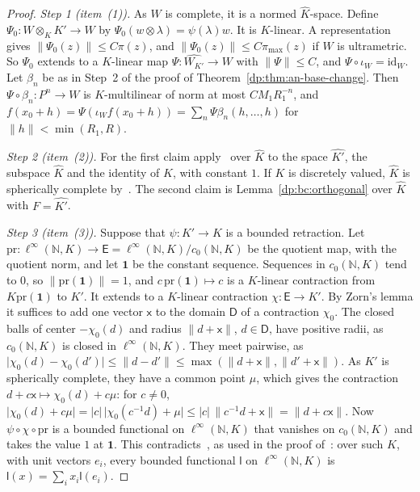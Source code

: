 \documentclass[11pt]{amsart}
\theoremstyle{definition}
\theoremstyle{remark}
\numberwithin{equation}{section}
\newcommand{\N}{\mathbb N}
\newcommand{\linf}{\ell^\infty}
\newcommand{\id}{\mathrm{id}}
\newcommand{\abs}[1]{\lvert #1\rvert}
\newcommand{\norm}[1]{\lVert #1\rVert}
\newcommand{\Kh}{\widehat K}
\theoremstyle{plain}
\theoremstyle{definition}
\theoremstyle{plain}
\begin{document}
\begin{proof}
\emph{Step 1 (item~(1)).} As $W$ is complete, it is a normed $\Kh$-space. Define $\Psi_0\colon W\otimes_KK'\to W$ by $\Psi_0(w\otimes\lambda)=\psi(\lambda)w$. It is $K$-linear. A representation gives $\norm{\Psi_0(z)}\le C\pi(z)$, and $\norm{\Psi_0(z)}\le C\pi_{\max}(z)$ if $W$ is ultrametric. So $\Psi_0$ extends to a $K$-linear map $\Psi\colon\widehat{W_{K'}}\to W$ with $\norm\Psi\le C$, and $\Psi\circ\iota_W=\id_W$. Let $\beta_n$ be as in Step~2 of the proof of Theorem~\ref{dp:thm:an-base-change}. Then $\Psi\circ\beta_n\colon P^n\to W$ is $K$-multilinear of norm at most $CM_1R_1^{-n}$, and $f(x_0+h)=\Psi(\iota_Wf(x_0+h))=\sum_n\Psi\beta_n(h,\dots,h)$ for $\norm h<\min(R_1,R)$.

\emph{Step 2 (item~(2)).} For the first claim apply~\cite[Theorem~D.3]{I} over $\Kh$ to the space $\widehat{K'}$, the subspace $\Kh$ and the identity of $\Kh$, with constant $1$. If $K$ is discretely valued, $\Kh$ is spherically complete by~\cite[Lemma~D.1]{I}. The second claim is Lemma~\ref{dp:bc:orthogonal} over $\Kh$ with $F=\widehat{K'}$.

\emph{Step 3 (item~(3)).} Suppose that $\psi\colon K'\to K$ is a bounded retraction. Let $\mathrm{pr}\colon\linf(\N,K)\to\mathsf E=\linf(\N,K)/c_0(\N,K)$ be the quotient map, with the quotient norm, and let $\mathbf 1$ be the constant sequence. Sequences in $c_0(\N,K)$ tend to $0$, so $\norm{\mathrm{pr}(\mathbf 1)}=1$, and $c\,\mathrm{pr}(\mathbf 1)\mapsto c$ is a $K$-linear contraction from $K\mathrm{pr}(\mathbf 1)$ to $K'$. It extends to a $K$-linear contraction $\chi\colon\mathsf E\to K'$. By Zorn's lemma it suffices to add one vector $\mathsf x$ to the domain $\mathsf D$ of a contraction $\chi_0$. The closed balls of center $-\chi_0(d)$ and radius $\norm{d+\mathsf x}$, $d\in\mathsf D$, have positive radii, as $c_0(\N,K)$ is closed in $\linf(\N,K)$. They meet pairwise, as $\abs{\chi_0(d)-\chi_0(d')}\le\norm{d-d'}\le\max(\norm{d+\mathsf x},\norm{d'+\mathsf x})$. As $K'$ is spherically complete, they have a common point $\mu$, which gives the contraction $d+c\mathsf x\mapsto\chi_0(d)+c\mu$: for $c\ne0$, $\abs{\chi_0(d)+c\mu}=\abs c\,\abs{\chi_0(c^{-1}d)+\mu}\le\abs c\,\norm{c^{-1}d+\mathsf x}=\norm{d+c\mathsf x}$. Now $\psi\circ\chi\circ\mathrm{pr}$ is a bounded functional on $\linf(\N,K)$ that vanishes on $c_0(\N,K)$ and takes the value $1$ at $\mathbf 1$. This contradicts~\cite[Th\'eor\`eme~4.1]{VdP}, as used in the proof of~\cite[Lemma~F.2]{I}: over such $K$, with unit vectors $e_i$, every bounded functional $\mathsf l$ on $\linf(\N,K)$ is $\mathsf l(x)=\sum_ix_i\mathsf l(e_i)$.
\end{proof}
\end{document}
